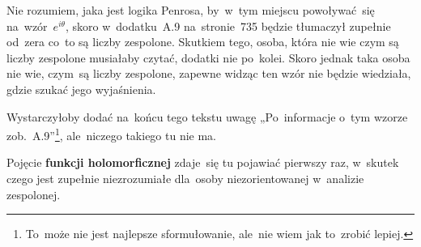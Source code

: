 \documentclass[a4paper,11pt]{article}
\begin{document}
\start {} Nie rozumiem, jaka jest logika Penrosa, by~w~tym
miejscu powoływać~się na~wzór~$e^{ i \theta }$, skoro w~dodatku~A.9
na~stronie~735 będzie tłumaczył zupełnie od~zera co~to są liczby
zespolone. Skutkiem tego, osoba, która nie wie czym są liczby
zespolone musiałaby czytać, dodatki nie po~kolei. Skoro jednak taka
osoba nie wie, czym~są liczby zespolone, zapewne widząc ten wzór nie
będzie wiedziała, gdzie szukać jego wyjaśnienia.

Wystarczyłoby dodać na~końcu tego tekstu uwagę „Po~informacje o~tym
wzorze zob.~A.9”\footnote{To~może nie jest najlepsze sformułowanie,
  ale~nie wiem jak to~zrobić lepiej.}, ale~niczego takiego tu nie ma.

\vspace{\spaceFour}





\start {} Pojęcie \textbf{funkcji holomorficznej} zdaje~się tu
pojawiać pierwszy raz, w~skutek czego jest zupełnie niezrozumiałe
dla~osoby niezorientowanej w~analizie zespolonej.





\end{document}
